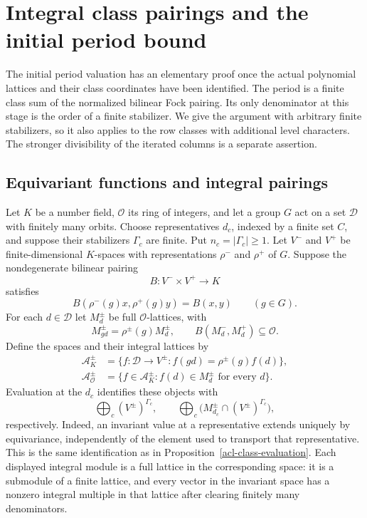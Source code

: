 \section{Integral class pairings and the initial period bound}
\label{cp-section}

The initial period valuation has an elementary proof once the
actual polynomial lattices and their class coordinates have been
identified. The period is a finite class sum of the normalized
bilinear Fock pairing. Its only denominator at this stage is the
order of a finite stabilizer. We give the argument with arbitrary
finite stabilizers, so it also applies to the row classes with
additional level characters. The stronger divisibility of the
iterated columns is a separate assertion.

\subsection{Equivariant functions and integral pairings}

Let $K$ be a number field, $\mathcal O$ its ring of integers, and
let a group $G$ act on a set $\mathcal D$ with finitely many orbits.
Choose representatives $d_c$, indexed by a finite set $C$, and
suppose their stabilizers $\Gamma_c$ are finite. Put
$n_c=|\Gamma_c|\ge1$. Let $V^-$ and $V^+$ be finite-dimensional
$K$-spaces with representations $\rho^-$ and $\rho^+$ of $G$.
Suppose the nondegenerate bilinear pairing
\[
                    B:V^-\times V^+\longrightarrow K
\]
satisfies
\begin{equation}\label{cp-invariance}
 B(\rho^-(g)x,\rho^+(g)y)=B(x,y)\qquad(g\in G).
\end{equation}
For each $d\in\mathcal D$ let $M_d^\pm$ be full
$\mathcal O$-lattices, with
\[
 M_{gd}^\pm=\rho^\pm(g)M_d^\pm,
 \qquad B(M_d^-,M_d^+)\subseteq\mathcal O.
\]
Define the spaces and their integral lattices by
\[
 \begin{split}
 \mathcal A^\pm_K
   &=\{f:\mathcal D\to V^\pm:
                         f(gd)=\rho^\pm(g)f(d)\},\\
 \mathcal A^\pm_{\mathcal O}
   &=\{f\in\mathcal A^\pm_K:f(d)\in M_d^\pm
                                      \text{ for every }d\}.
 \end{split}
\]
Evaluation at the $d_c$ identifies these objects with
\[
 \bigoplus_c(V^\pm)^{\Gamma_c},\qquad
 \bigoplus_c\bigl(M_{d_c}^\pm\cap(V^\pm)^{\Gamma_c}\bigr),
\]
respectively. Indeed, an invariant value at a representative
extends uniquely by equivariance, independently of the element
used to transport that representative. This is the same
identification as in Proposition~\ref{acl-class-evaluation}.
Each displayed integral module is a full lattice in the
corresponding space: it is a submodule of a finite lattice, and
every vector in the invariant space has a nonzero integral
multiple in that lattice after clearing finitely many denominators.

